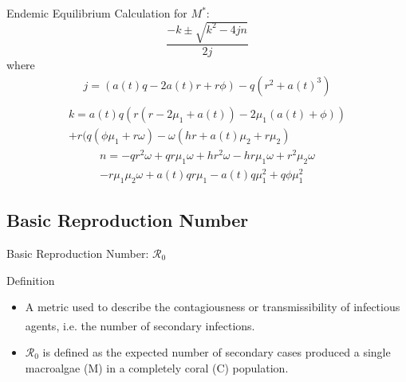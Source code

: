 \documentclass{beamer}
\begin{document}
\begin{frame}{Endemic Equilibrium}
Calculation for $M^{*}$:\\
\begin{equation*}
    \frac{-k \pm \sqrt{k^2 - 4jn}}{2j}
\end{equation*}
where
\begin{multline*}
    j = (a(t)q-2a(t)r+r \phi ) - q(r^{2}+a(t)^{3})\\
\end{multline*}
\vspace{-1.5cm}
\begin{multline*}
    k = a(t)q(r(r-2\mu_{1}+a(t))-2\mu_{1}(a(t)+\phi )) \\
    + r(q(\phi \mu_{1} + r \omega ) - \omega(hr+a(t) \mu_{2} + r\mu_{2})
\end{multline*}
\vspace{-1cm}
\begin{multline*}
    n = -qr^{2} \omega +qr\mu_{1} \omega + hr^{2} \omega - hr\mu_{1} \omega + r^2 \mu_{2} \omega\\
    - r \mu_{1} \mu_{2} \omega + a(t)qr \mu_{1} -  a(t)q\mu_{1}^{2} +q\phi \mu_{1}^{2}
\end{multline*}

\end{frame}

\subsection{Basic Reproduction Number}
\begin{frame}{Basic Reproduction Number: $\mathscr{R}_{0}$}
    \begin{block}{Definition}
        \begin{itemize}
            \item A metric used to describe the contagiousness or transmissibility of infectious agents\textsuperscript{\cite{delamater_street_leslie_yang_jacobsen_2019}}, i.e. the number of secondary infections. %
            \item $\mathscr{R}_{0}$ is defined as the expected number of secondary cases produced a single macroalgae (M) in a completely coral (C) population. %
        \end{itemize}
    \end{block}
\end{frame}
\end{document}
